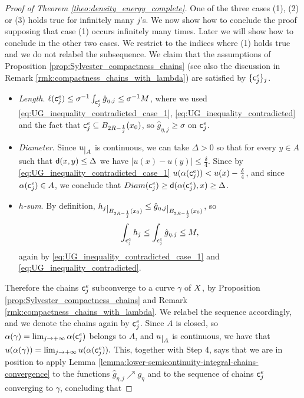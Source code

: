 \documentclass[12pt]{amsart}
\newcommand{\sfd}{{\sf d}}
\newcommand{\restr}[1]{\lower3pt\hbox{$|_{#1}$}}
\newcommand{\X}{{\rm X}}
\theoremstyle{definition}
\newcommand{\sfc}{{\sf c}}
\begin{document}
\begin{proof}[Proof of Theorem \ref{theo:density_energy_complete}]
    One of the three cases (1), (2) or (3) holds true for infinitely many $j$'s. We now show how to conclude the proof supposing that case (1) occurs infinitely many times. Later we will show how to conclude in the other two cases. We restrict to the indices where (1) holds true and we do not relabel the subsequence. We claim that the assumptions of Proposition \ref{prop:Sylvester_compactness_chains} (see also the discussion in Remark \ref{rmk:compactness_chains_with_lambda}) are satisfied by $\{ \sfc_j^e \}_j$.
    \begin{itemize}
        \item {\em Length}. $\ell(\sfc_j^e) \le \sigma^{-1}\int_{\sfc_j^e}\hat{g}_{\eta,j} \le \sigma^{-1}M$, where we used \eqref{eq:UG_inequality_contradicted_case_1}, \eqref{eq:UG_inequality_contradicted} and the fact that $\sfc_j^e \subseteq B_{2R - \frac{1}{j}}(x_0)$, so $\hat{g}_{\eta,j} \ge \sigma$  on $\sfc_j^e$. 
        \item {\em Diameter}. Since $u\restr{A}$ is continuous, we can take $\Delta > 0$ so that for every $y\in A$ such that $\sfd(x, y) \le \Delta$ we have $\vert u(x) - u(y) \vert \le \frac{\delta}{4}$. Since by \eqref{eq:UG_inequality_contradicted_case_1} $u(\alpha(\sfc_j^e)) < u(x) - \frac{\delta}{4}$, and since $\alpha(\sfc_j^e) \in A$, we conclude that ${\rm Diam}(\sfc_j^e) \ge \sfd(\alpha(\sfc_j^e), x) \ge \Delta$.
        \item {\em $h$-sum}. By definition, $h_j\restr{B_{2R - \frac{1}{j}}(x_0)} \le \hat{g}_{\eta,j}\restr{B_{2R - \frac{1}{j}}(x_0)}$, so
        \begin{equation}
            \label{eq:weight_upper_bound}
            \int_{\sfc_j^e}h_j \le \int_{\sfc_j^e} \hat{g}_{\eta,j}\le M,
        \end{equation}
        again by \eqref{eq:UG_inequality_contradicted_case_1} and \eqref{eq:UG_inequality_contradicted}.
    \end{itemize}
    Therefore the chains $\sfc_j^e$ subconverge to a curve $\gamma$ of $\X$, by Proposition \ref{prop:Sylvester_compactness_chains} and Remark \ref{rmk:compactness_chains_with_lambda}. We relabel the sequence accordingly, and we denote the chains again by $\sfc_j^e$. Since $A$ is closed, so $\alpha(\gamma) = \lim_{j\to +\infty} \alpha(\sfc_j^e)$ belongs to $A$, and $u\restr{A}$ is continuous, we have that 
    $u(\alpha(\gamma)) = \lim_{j\to +\infty} u(\alpha(\sfc_j^e)).$
    This, together with Step 4, says that we are in position to apply Lemma \ref{lemma:lower-semicontinuity-integral-chains-convergence} to the functions $\hat{g}_{\eta,j} \nearrow g_\eta$ and to the sequence of chains $\sfc_j^e$ converging to $\gamma$, concluding that

\end{proof}
\end{document}
